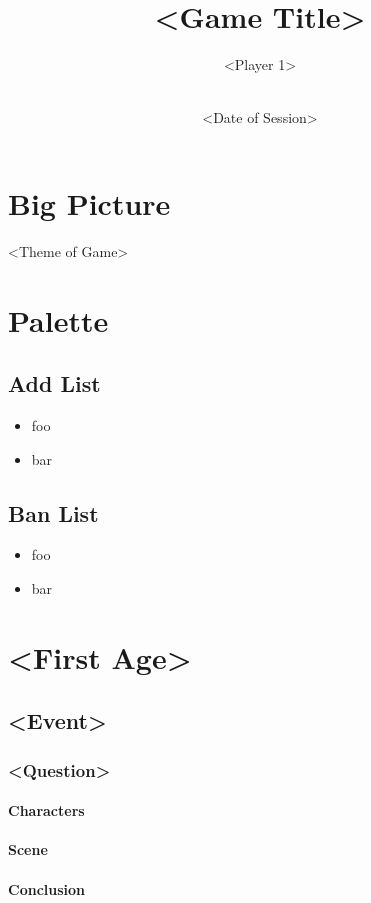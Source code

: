 \documentclass[letterpaper,twoside,openany]{book}
\title{<Game Title>}
\author{<Player 1>\\<Player 2>\\<Player 3>}
\date{<Date of Session>}
\newcommand{\light}{\textopenbullet}
\newcommand{\dark}{\textbullet}
\begin{document}
	\frontmatter
	\maketitle

	\tableofcontents

	\chapter{Big Picture}
	\epigraph{<Theme of Game>}{}

	\chapter{Palette}
	\section*{Add List}
	\begin{itemize}
		\item foo
		\item bar
	\end{itemize}
	\section*{Ban List}
	\begin{itemize}
		\item foo
		\item bar
	\end{itemize}

	\mainmatter

	\chapter{ <First Age> \light }
	\section{ <Event> \dark }
	\subsection{ <Question> }
	\subsubsection{Characters}
	\subsubsection{Scene}
	\subsubsection{Conclusion}
\end{document}
